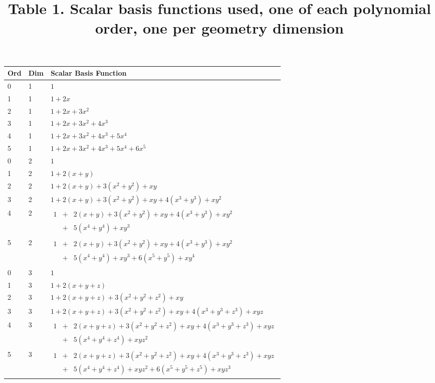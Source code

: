 \begin{center}
\begin{tabular}{ | l | l | l |}
  \hline
  Ord & Dim & Scalar Basis Function \\ \hline
  0 & 1 & $1$ \\ \hline
  1 & 1 & $1 + 2x$ \\ \hline
  2 & 1 & $1 + 2x + 3x^2$ \\ \hline
  3 & 1 & $1 + 2x + 3x^2 + 4x^3$ \\ \hline
  4 & 1 & $1 + 2x + 3x^2 + 4x^3 + 5x^4$ \\ \hline
  5 & 1 & $1 + 2x + 3x^2 + 4x^3 + 5x^4 + 6x^5$ \\ \hline
  0 & 2 & $1$ \\ \hline
  1 & 2 & $1 + 2(x + y)$ \\ \hline
  2 & 2 & $1 + 2(x + y) + 3(x^2 + y^2) + xy$ \\ \hline
  3 & 2 & $1 + 2(x + y) + 3(x^2 + y^2) + xy + 4(x^3 + y^3) + xy^2$ \\ \hline
  4 & 2 & $\begin{array}{lcl} 1 & + & 2(x + y) + 3(x^2 + y^2) + xy + 4(x^3 + y^3) + xy^2 \\ & + & 5(x^4 + y^4) + xy^3 \end{array}$ \\ \hline
  5 & 2 & $\begin{array}{lcl} 1 & + & 2(x + y) + 3(x^2 + y^2) + xy + 4(x^3 + y^3) + xy^2 \\ & + & 5(x^4 + y^4) + xy^3 + 6(x^5 + y^5) + xy^4 \end{array}$ \\ \hline
  0 & 3 & $1$ \\ \hline
  1 & 3 & $1 + 2(x + y + z)$ \\ \hline
  2 & 3 & $1 + 2(x + y + z) + 3(x^2 + y^2 + z^2) + xy$ \\ \hline
  3 & 3 & $1 + 2(x + y + z) + 3(x^2 + y^2 + z^2) + xy + 4(x^3 + y^3 + z^3) + xyz$ \\ \hline
  4 & 3 & $\begin{array}{lcl} 1 & + & 2(x + y + z) + 3(x^2 + y^2 + z^2) + xy + 4(x^3 + y^3 + z^3) + xyz \\ & + & 5(x^4 + y^4 + z^4) + xyz^2 \end{array}$ \\ \hline
  5 & 3 & $\begin{array}{lcl} 1 & + & 2(x + y + z) + 3(x^2 + y^2 + z^2) + xy + 4(x^3 + y^3 + z^3) + xyz \\ & + & 5(x^4 + y^4 + z^4) + xyz^2 + 6(x^5 + y^5 + z^5) + xyz^3 \end{array}$ \\ \hline
\end{tabular}
\vfill
\title{Table 1. Scalar basis functions used, one of each polynomial order, one per geometry dimension}
\end{center}

